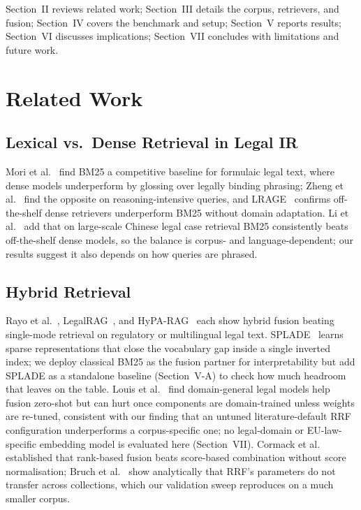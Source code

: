 \documentclass[conference,a4paper]{IEEEtran}
\begin{document}
Section~II reviews related work; Section~III details the corpus,
retrievers, and fusion; Section~IV covers the benchmark and setup;
Section~V reports results; Section~VI discusses implications;
Section~VII concludes with limitations and future work.

\section{Related Work}

\subsection{Lexical vs.\ Dense Retrieval in Legal IR}

Mori et al.~\cite{1} find BM25 a competitive baseline for formulaic
legal text, where dense models underperform by glossing over legally
binding phrasing; Zheng et al.~\cite{7} find the opposite on
reasoning-intensive queries, and LRAGE~\cite{13} confirms
off-the-shelf dense retrievers underperform BM25 without domain
adaptation.
Li et al.~\cite{21} add that on large-scale Chinese legal case
retrieval BM25 consistently beats off-the-shelf dense models, so the
balance is corpus- and language-dependent; our results suggest it
also depends on how queries are phrased.

\subsection{Hybrid Retrieval}

Rayo et al.~\cite{3}, LegalRAG~\cite{9}, and HyPA-RAG~\cite{2} each
show hybrid fusion beating single-mode retrieval on regulatory or
multilingual legal text.
SPLADE~\cite{4} learns sparse representations that close the
vocabulary gap inside a single inverted index; we deploy classical
BM25 as the fusion partner for interpretability but add SPLADE as a
standalone baseline (Section~V-A) to check how much headroom that
leaves on the table.
Louis et al.~\cite{25} find domain-general legal models help fusion
zero-shot but can hurt once components are domain-trained unless
weights are re-tuned, consistent with our finding that an untuned
literature-default RRF configuration underperforms a corpus-specific
one; no legal-domain or EU-law-specific embedding model is evaluated
here (Section~VII).
Cormack et al.~\cite{14} established that rank-based fusion beats
score-based combination without score normalisation; Bruch et
al.~\cite{20} show analytically that RRF's parameters do not transfer
across collections, which our validation sweep reproduces on a much
smaller corpus.
\end{document}
